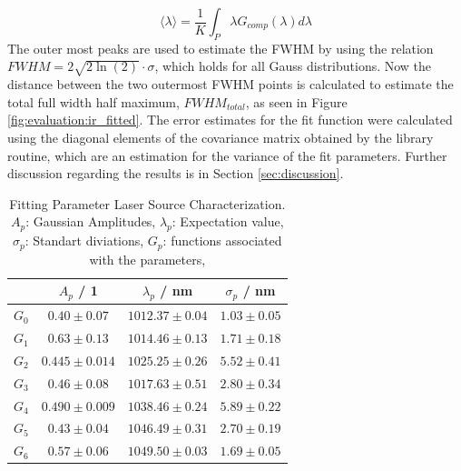 \begin{equation}
    \langle \lambda \rangle = \frac{1}{K} \int_{P}\lambda G_{comp}(\lambda) d \lambda
    \label{eq:evaluation:central}
\end{equation}
The outer most peaks are used to estimate the FWHM by using the relation $FWHM = 2 \sqrt{2 \ln(2)} \cdot \sigma$, which holds for all Gauss distributions.
Now the distance between the two outermost FWHM points is calculated to estimate the total full width half maximum, $FWHM_{total}$, as seen in Figure \ref{fig:evaluation:ir_fitted}.
The error estimates for the fit function were calculated using the diagonal elements of the covariance matrix obtained by the library routine, which are an estimation for the variance of the fit parameters.
Further discussion regarding the results is in Section \ref{sec:discussion}.
\begin{table}[H]
\centering
\caption{
    Fitting Parameter Laser Source Characterization. \\
    $A_p$: Gaussian Amplitudes,
    $\lambda_p$: Expectation value,
    $\sigma_p$: Standart diviations,
    $G_p$: functions associated with the parameters,
}
\begin{tabular}{c|ccc} \hline
    &  $A_p$ / 1 &  $\lambda_p$ / nm & $\sigma_p$ / nm  \\ \hline  \hline 
$G_0$&$0.40 \pm 0.07$&$1012.37 \pm 0.04$&$1.03 \pm 0.05$\\ \hline
$G_1$&$0.63 \pm 0.13$&$1014.46 \pm 0.13$&$1.71 \pm 0.18$\\ \hline
$G_2$&$0.445 \pm 0.014$&$1025.25 \pm 0.26$&$5.52 \pm 0.41$\\ \hline
$G_3$&$0.46 \pm 0.08$&$1017.63 \pm 0.51$&$2.80 \pm 0.34$\\ \hline
$G_4$&$0.490 \pm 0.009$&$1038.46 \pm 0.24$&$5.89 \pm 0.22$\\ \hline
$G_5$&$0.43 \pm 0.04$&$1046.49 \pm 0.31$&$2.70 \pm 0.19$\\ \hline
$G_6$&$0.57 \pm 0.06$&$1049.50 \pm 0.03$&$1.69 \pm 0.05$\\ \hline
\end{tabular}
\label{tab:evaluation:ir_fitted1}
\end{table}
\newpage
